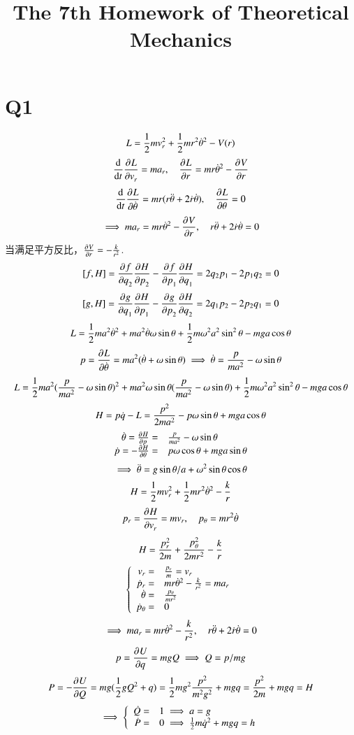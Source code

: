 \documentclass[UTF8,9pt]{ctexart}
\title{The 7th Homework of Theoretical Mechanics}
\begin{document}
 
\maketitle
\section{Q1}
$$L=\ff{2}mv_r^2+\ff{2}mr^2\dot\t^2-V(r)$$
$$\dt{}\pp{L}{v_r}=ma_r,\quad \pp{L}{r}=mr\dot\t^2-\pp{V}{r}$$
$$\dt{}\pp{L}{\dot\t}=mr(r\ddot\t+2\dot r\dot\t),\quad \pp{L}{\t}=0$$
$$\ip ma_r=mr\dot\t^2-\pp{V}{r},\quad r\ddot\t+2\dot r\dot\t=0$$
当满足平方反比，$\pp{V}{r}=-\f{k}{r^2}$.
$$[f,H]=\pp{f}{q_2}\pp{H}{p_2}-\pp{f}{p_1}\pp{H}{q_1}=2q_2p_1-2p_1q_2=0$$
$$[g,H]=\pp{g}{q_1}\pp{H}{p_1}-\pp{g}{p_2}\pp{H}{q_2}=2q_1p_2-2p_2q_1=0$$
$$L=\ff{2}ma^2\dot\t^2+ma^2\dot\t\o\sin\t+\ff{2}m\o^2a^2\sin^2\t-mga\cos\t$$
$$p=\pp{L}{\dot\t}=ma^2(\dot\t+\o\sin\t) \ip \dot\t=\f{p}{ma^2}-\o\sin\t$$
$$L=\ff{2}ma^2(\f{p}{ma^2}-\o\sin\t)^2+ma^2\o\sin\t(\f{p}{ma^2}-\o\sin\t)+\ff{2}m\o^2a^2\sin^2\t-mga\cos\t$$
$$H=p\dot q-L=\f{p^2}{2ma^2}-p\o\sin\t+mga\cos\t$$
$$\ar{
    \dot \t=\pp{H}{p}=&\f{p}{ma^2}-\o\sin\t\\
    \dot p=-\pp{H}{\t}=&p\o\cos\t+mga\sin\t
}$$
$$\ip \ddot\t=g\sin\t/a+\o^2\sin\t\cos\t$$
$$H=\ff{2}mv_r^2+\ff{2}mr^2\dot\t^2-\f{k}{r}$$
$$p_r=\pp{H}{v_r}=mv_r,\quad p_\t=mr^2\dot\t$$
$$H=\f{p_r^2}{2m}+\f{p_\t^2}{2mr^2}-\f{k}{r}$$
$$\left\{\ar{
    v_r=&\f{p_r}{m}=v_r\\
    \dot p_r=&mr\dot\t^2-\f{k}{r^2}=ma_r\\
    \dot\t=&\f{p_\t}{mr^2}\\
    \dot p_\t=&0
}\right.$$
$$\ip ma_r=mr\dot\t^2-\f{k}{r^2},\quad r\ddot\t+2\dot r\dot\t=0$$
$$p=\pp{U}{q}=mgQ \ip Q=p/mg$$
$$P=-\pp{U}{Q}=mg(\ff{2}gQ^2+q)=\ff{2}mg^2\f{p^2}{m^2g^2}+mgq=\f{p^2}{2m}+mgq=H$$
$$\ip \left\{\ar{
    \dot Q=&1 \ip a=g\\
    \dot P=&0 \ip \ff{2}m\dot q^2+mgq=h
}\right.$$
\end{document}
